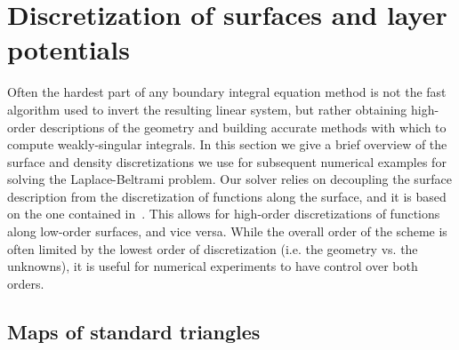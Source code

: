 \documentclass[11pt]{article}
\numberwithin{equation}{section}
\begin{document}
\section{Discretization of surfaces and layer potentials}
\label{sec_surfaces}

Often the hardest part of any boundary integral equation method is not
the fast algorithm used to invert the resulting linear system, but
rather obtaining high-order descriptions of the geometry and building
accurate methods with which to compute weakly-singular integrals.  In
this section we give a brief overview of the surface and density
discretizations we
use for subsequent numerical examples for solving the Laplace-Beltrami
problem. Our solver relies on decoupling the surface description from
the discretization of functions along the surface, and it is based on
the one contained in~\cite{bremer_2012c, bremer_2013}.
This allows for high-order discretizations of functions along
low-order surfaces, and vice versa.
While the overall order of the scheme is often limited by the lowest
order of discretization (i.e. the geometry vs. the unknowns), it is
useful for numerical experiments to have control over both orders.


\subsection{Maps of standard triangles}
\label{sec_standard}
\end{document}
